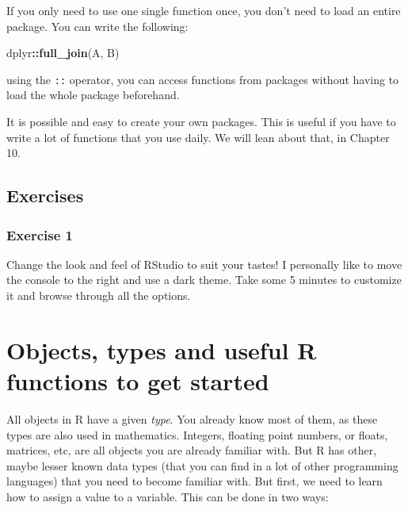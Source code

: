 \documentclass[]{gitbook}
\newenvironment{Shaded}{\begin{snugshade}}{\end{snugshade}}
\newcommand{\KeywordTok}[1]{\textcolor[rgb]{0.13,0.29,0.53}{\textbf{#1}}}
\newcommand{\NormalTok}[1]{#1}
\newcommand{\OperatorTok}[1]{\textcolor[rgb]{0.81,0.36,0.00}{\textbf{#1}}}
\begin{document}
If you only need to use one single function once, you don't need to load an entire package. You can
write the following:

\begin{Shaded}
\begin{Highlighting}[]
\NormalTok{dplyr}\OperatorTok{::}\KeywordTok{full_join}\NormalTok{(A, B)}
\end{Highlighting}
\end{Shaded}

using the \texttt{::} operator, you can access functions from packages without having to load the whole
package beforehand.

It is possible and easy to create your own packages. This is useful if you have to write a lot of
functions that you use daily. We will lean about that, in Chapter 10.

\hypertarget{exercises}{%
\subsection{Exercises}\label{exercises}}

\hypertarget{exercise-1}{%
\subsubsection*{Exercise 1}\label{exercise-1}}

Change the look and feel of RStudio to suit your tastes! I personally like to move the console
to the right and use a dark theme. Take some 5 minutes to customize it and browse through all the options.

\hypertarget{objects-types-and-useful-r-functions-to-get-started}{%
\section{Objects, types and useful R functions to get started}\label{objects-types-and-useful-r-functions-to-get-started}}

All objects in R have a given \emph{type}. You already know most of them, as these types are also used
in mathematics. Integers, floating point numbers, or floats, matrices, etc, are all objects you
are already familiar with. But R has other, maybe lesser known data types (that you can find in a
lot of other programming languages) that you need to become familiar with. But first, we need to
learn how to assign a value to a variable. This can be done in two ways:
\end{document}
